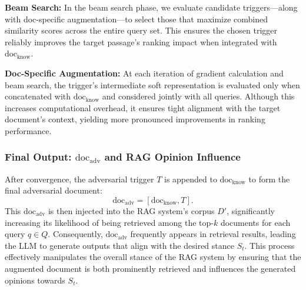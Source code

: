 \textbf{Beam Search:} In the beam search phase, we evaluate candidate triggers—along with doc-specific augmentation—to select those that maximize combined similarity scores across the entire query set. This ensures the chosen trigger reliably improves the target passage’s ranking impact when integrated with \(\text{doc}_{\text{know}}\).

\textbf{Doc-Specific Augmentation:} At each iteration of gradient calculation and beam search, the trigger’s intermediate soft representation is evaluated only when concatenated with \(\text{doc}_{\text{know}}\) and considered jointly with all queries. Although this increases computational overhead, it ensures tight alignment with the target document’s context, yielding more pronounced improvements in ranking performance.



\subsubsection{Final Output: $\text{doc}_{\text{adv}}$ and RAG Opinion Influence}
After convergence, the adversarial trigger $T$ is appended to $\text{doc}_{\text{know}}$ to form the final adversarial document:
\[
\text{doc}_{\text{adv}} = [\text{doc}_{\text{know}}, T].
\]
This $\text{doc}_{\text{adv}}$ is then injected into the RAG system's corpus $D'$, significantly increasing its likelihood of being retrieved among the top-$k$ documents for each query $q \in Q$. Consequently, $\text{doc}_{\text{adv}}$ frequently appears in retrieval results, leading the LLM to generate outputs that align with the desired stance $S_t$. This process effectively manipulates the overall stance of the RAG system by ensuring that the augmented document is both prominently retrieved and influences the generated opinions towards $S_t$.


